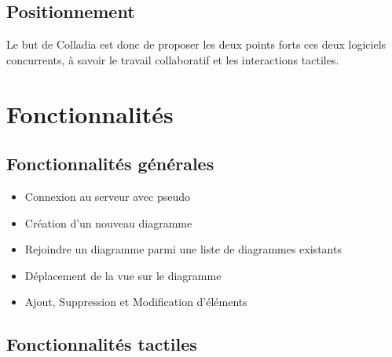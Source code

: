\documentclass[a4paper,11pt]{article}
\begin{document}
\subsection{Positionnement}

Le but de Colladia est donc de proposer les deux points forts ces deux logiciels concurrents, à savoir le travail collaboratif et les interactions tactiles.


\section{Fonctionnalités}
\subsection{Fonctionnalités générales}
	\begin{itemize}
		\item Connexion au serveur avec pseudo
		\item Création d'un nouveau diagramme
		\item Rejoindre un diagramme parmi une liste de diagrammes existants
		\item Déplacement de la vue sur le diagramme
		\item Ajout, Suppression et Modification d'éléments
	\end{itemize}
\subsection{Fonctionnalités tactiles}
\end{document}
